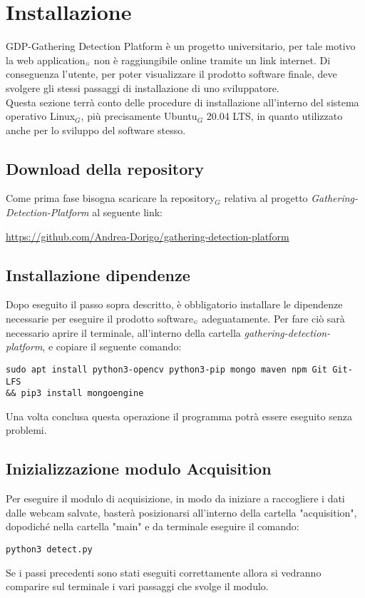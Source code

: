 \section{Installazione}\label{RequisitiDiSistemaEdInstallazioneInstallazione}

 GDP-Gathering Detection Platform è un progetto universitario, per tale motivo la web application$_{\scaleto{G}{3pt}}$ non è raggiungibile online tramite un link internet. Di conseguenza l'utente, per poter visualizzare il prodotto software finale, deve svolgere gli stessi passaggi di installazione di uno sviluppatore.\\
Questa sezione terrà conto delle procedure di installazione all'interno del sistema operativo Linux$_G$, più precisamente Ubuntu$_G$ 20.04 LTS, in quanto utilizzato anche per lo sviluppo del software stesso.

\subsection{Download della  repository}\label{RequisitiDiSistemaEdInstallazioneInstallazioneDownloadRepo}
Come prima fase bisogna scaricare la repository$_G$ relativa al progetto \textit{Gathering-Detection-Platform} al seguente link:
\begin{center}
	\item \url{https://github.com/Andrea-Dorigo/gathering-detection-platform}
\end{center}

\subsection{Installazione dipendenze}\label{RequisitiDiSistemaEdInstallazioneInstallazioneInstallazioneDipendenze}
Dopo eseguito il passo sopra descritto, è obbligatorio installare le dipendenze necessarie per eseguire il prodotto software$_{\scaleto{G}{3pt}}$ adeguatamente.
Per fare ciò sarà necessario aprire il terminale, all'interno della cartella \textit{gathering-detection-platform}, e copiare il seguente comando:
\begin{lstlisting}
sudo apt install python3-opencv python3-pip mongo maven npm Git Git-LFS 
&& pip3 install mongoengine
\end{lstlisting}

Una volta conclusa questa operazione il programma potrà essere eseguito senza problemi.

\subsection{Inizializzazione modulo Acquisition}\label{RequisitiDiSistemaEdInstallazioneInstallazioneInizializzazioneModuloAcquisition}
Per eseguire il modulo di acquisizione, in modo da iniziare a raccogliere i dati dalle webcam salvate, basterà posizionarsi all'interno della cartella "acquisition", dopodiché nella cartella "main" e da terminale eseguire il comando:
\begin{lstlisting}
python3 detect.py
\end{lstlisting}
Se i passi precedenti sono stati eseguiti correttamente allora si vedranno comparire sul terminale i vari passaggi che svolge il modulo.

